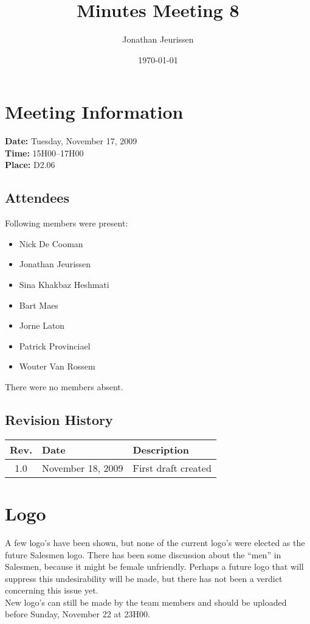 \documentclass[a4paper, 12pt]{article}
\begin{document}
\title{Minutes Meeting 8}
\author{Jonathan Jeurissen}
\date{\today}

\maketitle	
	\section{Meeting Information}
		\textbf{Date:} Tuesday, November 17, 2009\\
		\textbf{Time:} 15H00--17H00\\
		\textbf{Place:} D2.06\\
		\subsection{Attendees}
Following members were present:
			\begin{itemize}
				\item Nick De Cooman
				\item Jonathan Jeurissen
				\item Sina Khakbaz Heshmati
				\item Bart Maes
				\item Jorne Laton
				\item Patrick Provinciael
				\item Wouter Van Rossem
			\end{itemize}
There were no members absent.
			
		\subsection{Revision History}
			\begin{tabular}{c | l | l }
				\textbf{Rev.} & \textbf{Date} & \textbf{Description} \\
				\hline
				1.0 & November 18, 2009 & First draft created \\
			\end{tabular}		

	\section{Logo}
A few logo's have been shown, but none of the current logo's were elected as the future Salesmen logo. There has been some discussion about the ``men'' in Salesmen, because it might be female unfriendly. Perhaps a future logo that will suppress this undesirability will be made, but there has not been a verdict concerning this issue yet. \\
New logo's can still be made by the team members and should be uploaded before Sunday, November 22 at 23H00.
\end{document}
